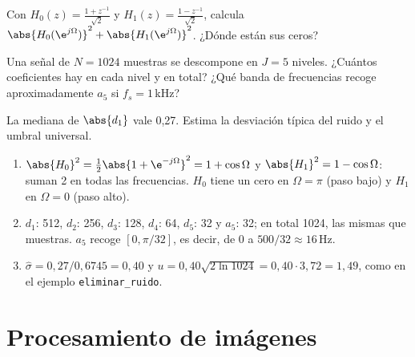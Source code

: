 \documentclass[11pt,a4paper]{scrartcl}
\begin{document}
\begin{ejercicio}
  \begin{incisos}[1]
    \item Con $H_0(z)=\frac{1+z^{-1}}{\sqrt2}$ y $H_1(z)=\frac{1-z^{-1}}{\sqrt2}$, calcula $\abs{H_0(\e^{j\Omega})}^2+\abs{H_1(\e^{j\Omega})}^2$. ¿Dónde están sus ceros?
    \item Una señal de $N=1024$ muestras se descompone en $J=5$ niveles. ¿Cuántos coeficientes hay en cada nivel y en total? ¿Qué banda de frecuencias recoge aproximadamente $a_5$ si $f_s=1$\,kHz?
    \item La mediana de $\abs{d_1}$ vale 0,27. Estima la desviación típica del ruido y el umbral universal.
  \end{incisos}
\end{ejercicio}
\begin{solucion}
  \begin{enumerate}[label=\alph*)]
    \item $\abs{H_0}^2=\frac12\abs{1+\e^{-j\Omega}}^2=1+\cos\Omega$ y $\abs{H_1}^2=1-\cos\Omega$: suman 2 en todas las frecuencias. $H_0$ tiene un cero en $\Omega=\pi$ (paso bajo) y $H_1$ en $\Omega=0$ (paso alto).
    \item $d_1$: 512, $d_2$: 256, $d_3$: 128, $d_4$: 64, $d_5$: 32 y $a_5$: 32; en total 1024, las mismas que muestras. $a_5$ recoge $[0,\pi/32]$, es decir, de 0 a $500/32\approx16$\,Hz.
    \item $\hat\sigma=0{,}27/0{,}6745=0{,}40$ y $u=0{,}40\sqrt{2\ln1024}=0{,}40\cdot3{,}72=1{,}49$, como en el ejemplo \texttt{eliminar\_ruido}.
  \end{enumerate}
\end{solucion}

\section*{Procesamiento de imágenes}
\end{document}
